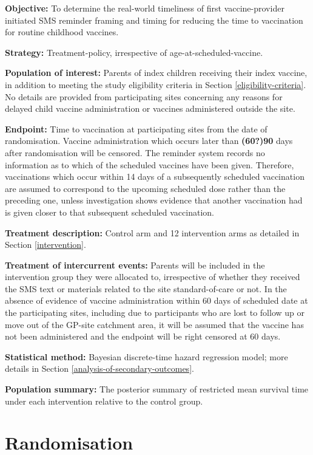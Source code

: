 \documentclass[
  bibliography=totoc]{scrreprt}
\begin{document}
\textbf{Objective:} To determine the real-world timeliness of first vaccine-provider initiated SMS reminder framing and timing for reducing the time to vaccination for routine childhood vaccines.

\textbf{Strategy:} Treatment-policy, irrespective of age-at-scheduled-vaccine.

\textbf{Population of interest:} Parents of index children receiving their index vaccine, in addition to meeting the study eligibility criteria in Section \ref{eligibility-criteria}.
No details are provided from participating sites concerning any reasons for delayed child vaccine administration or vaccines administered outside the site.

\textbf{Endpoint:} Time to vaccination at participating sites from the date of randomisation.
Vaccine administration which occurs later than \textbf{(60?)90} days after randomisation will be censored.
The reminder system records no information as to which of the scheduled vaccines have been given.
Therefore, vaccinations which occur within 14 days of a subsequently scheduled vaccination are assumed to correspond to the upcoming scheduled dose rather than the preceding one, unless investigation shows evidence that another vaccination had is given closer to that subsequent scheduled vaccination.

\textbf{Treatment description:} Control arm and 12 intervention arms as detailed in Section \ref{intervention}.

\textbf{Treatment of intercurrent events:} Parents will be included in the intervention group they were allocated to, irrespective of whether they received the SMS text or materials related to the site standard-of-care or not.
In the absence of evidence of vaccine administration within 60 days of scheduled date at the participating sites, including due to participants who are lost to follow up or move out of the GP-site catchment area, it will be assumed that the vaccine has not been administered and the endpoint will be right censored at 60 days.

\textbf{Statistical method:} Bayesian discrete-time hazard regression model; more details in Section \ref{analysis-of-secondary-outcomes}.

\textbf{Population summary:} The posterior summary of restricted mean survival time under each intervention relative to the control group.

\hypertarget{randomisation}{%
\section{Randomisation}\label{randomisation}}
\end{document}
